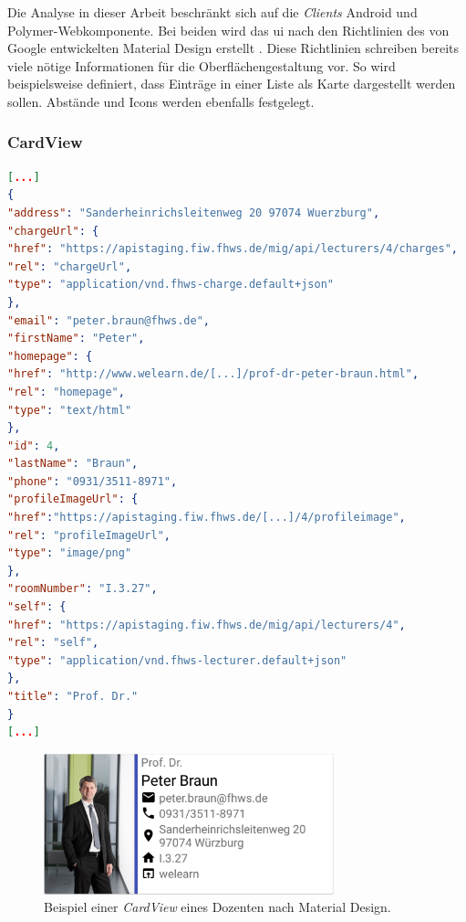 Die Analyse in dieser Arbeit beschränkt sich auf die \textit{Clients} Android und Polymer-Webkomponente. Bei beiden wird das \acf{ui} nach den Richtlinien des von Google entwickelten Material Design erstellt \cite{material}. Diese Richtlinien schreiben bereits viele nötige Informationen für die Oberflächengestaltung vor. So wird beispielsweise definiert, dass Einträge in einer Liste als Karte dargestellt werden sollen. Abstände und Icons werden ebenfalls festgelegt.

\subsubsection{CardView}


\begin{lstlisting}[label=lst:braun_json,
language=json,
firstnumber=1,
caption=Demo Daten eines Dozenten.]	
[...]	   
{
"address": "Sanderheinrichsleitenweg 20 97074 Wuerzburg",
"chargeUrl": {
"href": "https://apistaging.fiw.fhws.de/mig/api/lecturers/4/charges",
"rel": "chargeUrl",
"type": "application/vnd.fhws-charge.default+json"
},
"email": "peter.braun@fhws.de",
"firstName": "Peter",
"homepage": {
"href": "http://www.welearn.de/[...]/prof-dr-peter-braun.html",
"rel": "homepage",
"type": "text/html"
},
"id": 4,
"lastName": "Braun",
"phone": "0931/3511-8971",
"profileImageUrl": {
"href":"https://apistaging.fiw.fhws.de/[...]/4/profileimage",
"rel": "profileImageUrl",
"type": "image/png"
},
"roomNumber": "I.3.27",
"self": {
"href": "https://apistaging.fiw.fhws.de/mig/api/lecturers/4",
"rel": "self",
"type": "application/vnd.fhws-lecturer.default+json"
},
"title": "Prof. Dr."
}
[...]
\end{lstlisting}

\begin{figure}[H]
	\begin{center}
		\includegraphics[width=0.75\textwidth]{images/card.png}
		\caption{Beispiel einer \textit{CardView} eines Dozenten nach Material Design.}
		\label{fig:card}
	\end{center}
\end{figure}

